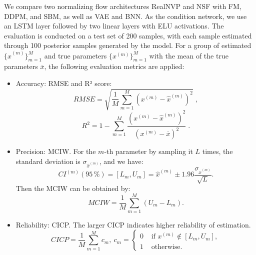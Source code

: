 We compare two normalizing flow architectures \ac{RealNVP} and \ac{NSF} with \ac{FM}, \ac{DDPM}, and \ac{SBM}, as well as \ac{VAE} and \ac{BNN}. As the condition network, we use an \ac{LSTM} layer followed by two linear layers with \ac{ELU} activations. The evaluation is conducted on a test set of 200 samples, with each sample estimated through 100 posterior samples generated by the model. For a group of estimated $\{ \widehat{x}^{(m)}\}_{m=1}^{M}$ and true parameters $ \{ x^{(m)}\}_{m=1}^{M}$ with the mean of the true parameters $\overline{x}$, the following evaluation metrics are applied:
\begin{itemize}
    \item Accuracy: \ac{RMSE} and R² score:
    \begin{equation}
        RMSE = \sqrt{\frac{1}{M}\sum_{m=1}^M (x^{(m)} - \widehat{x}^{(m)})^2}\;,
    \end{equation}
    \begin{equation}
        R^2 = 1 - \sum_{m=1}^{M}\frac{(x^{(m)}-\widehat{x}^{(m)})^2}{(x^{(m)}-\overline{x})^2}\;.
    \end{equation}

    \item Precision: \ac{MCIW}. For the $m$-th parameter by sampling it $L$ times, the standard deviation is $\sigma_{\widehat{x}^{(m)}}$, and we have:
    \begin{equation}
        CI^{(m)}(95\,\%)= [L_{m}, U_{m}] = \widehat{x}^{(m)}\pm 1.96\frac{\sigma_{\widehat{x}^{(m)}}}{\sqrt{L}}.
    \end{equation}
    Then the MCIW can be obtained by:
    \begin{equation}
        MCIW = \frac{1}{M}\sum_{m=1}^{M}(U_m - L_m).
    \end{equation}
    \item Reliability: \ac{CICP}. The larger \ac{CICP} indicates higher reliability of estimation.
    \begin{equation}
        CICP = \frac{1}{M}\sum_{m=1}^{M}c_m, \:
        c_m  = \begin{cases}
                0 & \text{ if } x ^{(m)} \notin [L_{m}, U_{m}], \\ 
                1 & \text{ otherwise. } 
              \end{cases}
    \end{equation}
\end{itemize}

